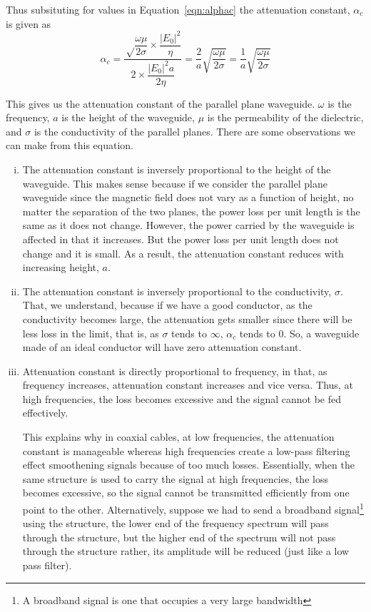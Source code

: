 Thus subsituting for values in Equation~\eqref{eqn:alphac} the attenuation constant, $\alpha_c$ is given as 
\begin{dmath}
\alpha_c = \frac{\sqrt\dfrac{\omega\mu}{2 \sigma}\times\dfrac{|E_0|^2}{\eta}}{2 \times \dfrac{|E_0|^2 a}{2 \eta}}
= \frac{2}{a}\sqrt{\frac{\omega\mu}{2\sigma}}=\frac{1}{a}\sqrt{\frac{\omega\mu}{2\sigma}}
\end{dmath}

This gives us the attenuation constant of the parallel plane waveguide. $\omega$ is the frequency, $a$ is the height of the waveguide, $\mu$ is the permeability of the dielectric, and $\sigma$ is the conductivity of the parallel planes. There are some observations we can make from this equation. 
\begin{enumerate}[(i)]
\item The attenuation constant is inversely proportional to the height of the waveguide. This makes sense because if we consider the parallel plane waveguide since the magnetic field does not vary as a function of height, no matter the separation of the two planes, the power loss per unit length is the same as it does not change. However, the power carried by the waveguide is affected in that it increases. But the power loss per unit length does not change and it is small. As a result, the attenuation constant reduces with increasing height, $a$.
\item The attenuation constant is inversely proportional to the conductivity, $\sigma$. That, we understand, because if we have a good conductor, as the conductivity becomes large, the attenuation gets smaller since there will be less loss in the limit, that is, as $\sigma$ tends to $\infty$, $\alpha_{c}$ tends to 0. So, a waveguide made of an ideal conductor will have zero attenuation constant.
\item Attenuation constant is directly proportional to frequency, in that, as frequency increases, attenuation constant increases and vice versa. Thus, at high frequencies, the loss becomes excessive and the signal cannot be fed effectively.

This explains why in coaxial cables, at low frequencies, the attenuation constant is manageable whereas high frequencies create a low-pass filtering effect smoothening signals because of too much losses. Essentially, when the same structure is used to carry the signal at high frequencies, the loss becomes excessive, so the signal cannot be transmitted efficiently from one point to the other. Alternatively, suppose we had to send a broadband signal\footnote{
A broadband signal is one that occupies a very large bandwidth
} using the structure, the lower end of the frequency spectrum will pass through the structure, but the higher end of the spectrum will not pass through the structure rather, its amplitude will be reduced (just like a low pass filter).
\end{enumerate}

